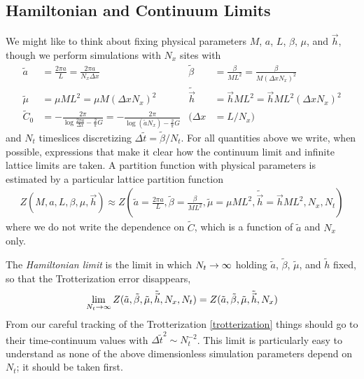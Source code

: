 \subsection{Hamiltonian and Continuum Limits}\label{sec:continuum limit}

We might like to think about fixing physical parameters $M$, $a$, $L$, $\beta$, $\mu$, and $\vec{h}$, though we perform simulations with $N_x$ sites with
\begin{align}
    \tilde{a} &= \frac{2\pi a}{L} = \frac{2\pi a}{N_x \Delta x}
    &
    \tilde{\beta} &= \frac{\beta}{M L^2} = \frac{\beta}{M(\Delta x N_x)^2}
    \nonumber\\
    \tilde{\mu} &= \mu M L^2 = \mu M (\Delta x N_x)^2
    &
    \tilde{\vec{h}} &= \vec{h} M L^2 = \vec{h} ML^2 (\Delta x N_x)^2
    \\\nonumber
    \tilde{C}_0 &
        = - \frac{2\pi}{\log \frac{2\pi a}{\Delta x} - \frac{2}{\pi} G}
        = - \frac{2\pi}{\log (\tilde{a} N_x) - \frac{2}{\pi} G}
    &
    (\Delta x &= L/N_x)
\end{align}
and $N_t$ timeslices discretizing $\Delta\tilde{t} = \tilde{\beta}/N_t$.
For all quantities above we write, when possible, expressions that make it clear how the continuum limit and infinite lattice limits are taken.
A partition function with physical parameters is estimated by a particular lattice partition function
\begin{align}
    Z\left(M, a, L, \beta, \mu, \vec{h}\right) \approx Z\left(\tilde{a} = \frac{2\pi a}{L}, \tilde{\beta} = \frac{\beta}{ML^2}, \tilde{\mu} = \mu ML^2, \tilde{\vec{h}} = \vec{h}ML^2, N_x, N_t \right)
\end{align}
where we do not write the dependence on $\tilde{C}$, which is a function of $\tilde{a}$ and $N_x$ only.

The \emph{Hamiltonian limit} is the limit in which $N_t\rightarrow\infty$ holding $\tilde{a}$, $\tilde{\beta}$, $\tilde{\mu}$, and $\tilde{h}$ fixed, so that the Trotterization error disappears,
\begin{align}
    \lim_{N_t\rightarrow\infty} Z(\tilde{a}, \tilde{\beta}, \tilde{\mu}, \tilde{\vec{h}}, N_x, N_t)
    =
    Z(\tilde{a}, \tilde{\beta}, \tilde{\mu}, \tilde{\vec{h}}, N_x)
    \label{eq:hamiltonian limit}
\end{align}
From our careful tracking of the Trotterization \eqref{trotterization} things should go to their time-continuum values with $\Delta{\tilde{t}}^2 \sim N_t^{-2}$.
This limit is particularly easy to understand as none of the above dimensionless simulation parameters depend on $N_t$; it should be taken first.

